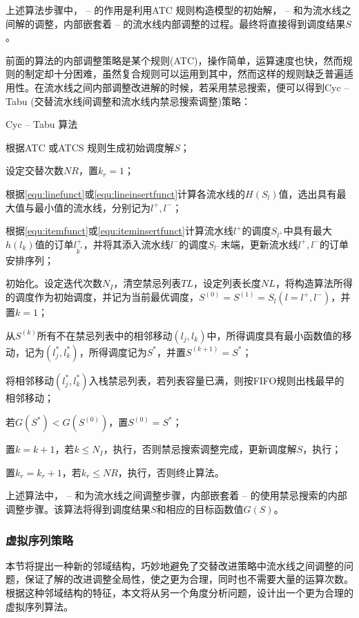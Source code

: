 上述算法步骤中， --  的作用是利用ATC 规则构造模型的初始解， -- 和为流水线之间解的调整，内部嵌套着 -- 的流水线内部调整的过程。最终将直接得到调度结果$S$。

前面的算法的内部调整策略是某个规则(ATC)，操作简单，运算速度也快，然而规则的制定却十分困难，虽然复合规则可以运用到其中，然而这样的规则缺乏普遍适用性。在流水线之间内部调整改进解的时候，若采用禁忌搜索，便可以得到Cyc -- Tabu (交替流水线间调整和流水线内禁忌搜索调整)策略：
\begin{algori}
Cyc -- Tabu 算法\label{alg:cyctabu}
\begin{asparaenum}
\renewcommand{\labelenumi}{\bf Step\theenumi~}
\item 根据ATC 或ATCS 规则生成初始调度解$S$；
\item 设定交替次数$NR$，置$k_r = 1$；
\item 根据\eqref{equ:linefunct}或\eqref{equ:lineinsertfunct}计算各流水线的$H(S_l)$值，选出具有最大值与最小值的流水线，分别记为$l^+, l^-$；
\item 根据\eqref{equ:itemfunct}或\eqref{equ:iteminsertfunct}计算流水线$l^+$的调度$S_{l^+}$中具有最大$h(l_k)$值的订单$l^+_{k^*}$，并将其添入流水线$l^-$的调度$S_{l^-}$末端，更新流水线$l^+, l^-$的订单安排序列；
\item 初始化。设定迭代次数$N_I$，清空禁忌列表$TL$，设定列表长度$NL$，将构造算法所得的调度作为初始调度，并记为当前最优调度，$S^{(0)} = S^{(1)} = S_l(l = l^+, l^-)$，并置$k = 1$；
\item 从$S^{(k)}$所有不在禁忌列表中的相邻移动$(l_j,l_k)$中，所得调度具有最小函数值的移动，记为$(l_j^*, l_k^*)$，所得调度记为$S^*$，并置$S^{(k+1)} = S^*$；
\item 将相邻移动$(l_j^*, l_k^*)$入栈禁忌列表，若列表容量已满，则按FIFO规则出栈最早的相邻移动；
\item 若$G(S^*) < G(S^{(0)})$，置$S^{(0)} = S^*$；
\item 置$k = k + 1$，若$k\le N_I$，执行，否则禁忌搜索调整完成，更新调度解$S$，执行；
\item 置$k_r = k_r + 1$，若$k_r\le NR$，执行，否则终止算法。
\end{asparaenum}
\end{algori}

上述算法中， --  和为流水线之间调整步骤，内部嵌套着 -- 的使用禁忌搜索的内部调整步骤。该算法将得到调度结果$S$和相应的目标函数值$G(S)$。
\subsubsection{虚拟序列策略}
本节将提出一种新的邻域结构，巧妙地避免了交替改进策略中流水线之间调整的问题，保证了解的改进调整全局性，使之更为合理，同时也不需要大量的运算次数。
根据这种邻域结构的特征，本文将从另一个角度分析问题，设计出一个更为合理的虚拟序列算法。

